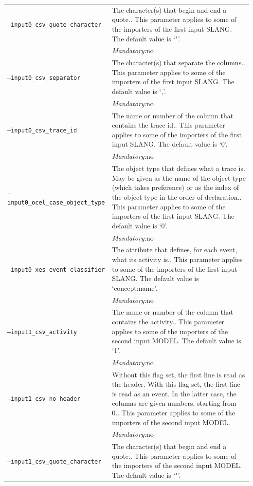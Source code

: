 {\begin{tabularx}{\linewidth}{lX}
\texttt{--input0\_csv\_quote\_character} & The character(s) that begin and end a quote.. This parameter applies to some of the importers of the first input SLANG. The default value is `"'.\\
&\textit{Mandatory:}\quad no\\
\texttt{--input0\_csv\_separator} & The character(s) that separate the columns.. This parameter applies to some of the importers of the first input SLANG. The default value is `,'.\\
&\textit{Mandatory:}\quad no\\
\texttt{--input0\_csv\_trace\_id} & The name or number of the column that contains the trace id.. This parameter applies to some of the importers of the first input SLANG. The default value is `0'.\\
&\textit{Mandatory:}\quad no\\
\texttt{--input0\_ocel\_case\_object\_type} & The object type that defines what a trace is. May be given as the name of the object type (which takes preference) or as the index of the object-type in the order of declaration.. This parameter applies to some of the importers of the first input SLANG. The default value is `0'.\\
&\textit{Mandatory:}\quad no\\
\texttt{--input0\_xes\_event\_classifier} & The attribute that defines, for each event, what its activity is.. This parameter applies to some of the importers of the first input SLANG. The default value is `concept:name'.\\
&\textit{Mandatory:}\quad no\\
\texttt{--input1\_csv\_activity} & The name or number of the column that contains the activity.. This parameter applies to some of the importers of the second input MODEL. The default value is `1'.\\
&\textit{Mandatory:}\quad no\\
\texttt{--input1\_csv\_no\_header} & Without this flag set, the first line is read as the header. 
    With this flag set, the first line is read as an event. In the latter case, the columns are given numbers, starting from 0.. This parameter applies to some of the importers of the second input MODEL. \\
&\textit{Mandatory:}\quad no\\
\texttt{--input1\_csv\_quote\_character} & The character(s) that begin and end a quote.. This parameter applies to some of the importers of the second input MODEL. The default value is `"'.\\

\end{tabularx}}
